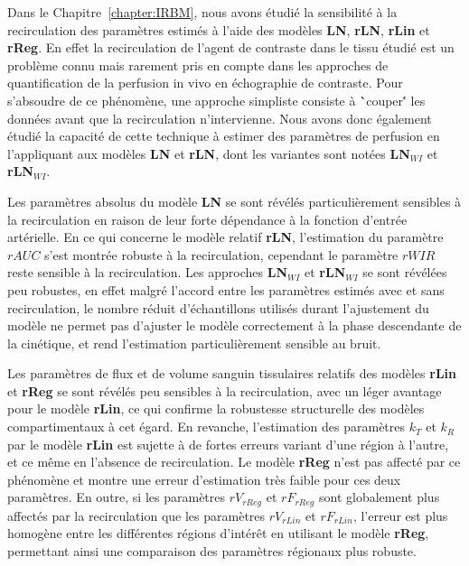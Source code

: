 \begin{otherlanguage}{francais}
Dans le Chapitre~\ref{chapter:IRBM}, nous avons \'etudi\'e la sensibilit\'e \`a la recirculation des param\`etres estim\'es \`a l'aide des mod\`eles \textbf{LN}, \textbf{rLN}, \textbf{rLin} et \textbf{rReg}.
En effet la recirculation de l'agent de contraste dans le tissu \'etudi\'e est un probl\`eme connu mais rarement pris en compte dans les approches de quantification de la perfusion in vivo en \'echographie de contraste.
Pour s'absoudre de ce ph\'enom\`ene, une approche simpliste consiste \`a \``couper\'' les donn\'ees avant que la recirculation n'intervienne.
Nous avons donc \'egalement \'etudi\'e la capacit\'e de cette technique \`a estimer des param\`etres de perfusion en l'appliquant aux mod\`eles \textbf{LN} et \textbf{rLN}, dont les variantes sont not\'ees \textbf{LN$_{WI}$} et \textbf{rLN$_{WI}$}.

Les param\`etres absolus du mod\`ele \textbf{LN} se sont r\'ev\'el\'es particuli\`erement sensibles \`a la recirculation en raison de leur forte d\'ependance \`a la fonction d'entr\'ee art\'erielle.
En ce qui concerne le mod\`ele relatif \textbf{rLN}, l'estimation du param\`etre $rAUC$ s'est montr\'ee robuste \`a la recirculation, cependant le param\`etre $rWIR$ reste sensible \`a la recirculation.
Les approches \textbf{LN$_{WI}$} et \textbf{rLN$_{WI}$} se sont r\'ev\'el\'ees peu robustes, en effet malgr\'e l'accord entre les param\`etres estim\'es avec et sans recirculation, le nombre r\'eduit d'\'echantillons utilis\'es durant l'ajustement du mod\`ele ne permet pas d'ajuster le mod\`ele correctement \`a la phase descendante de la cin\'etique, et rend l'estimation particuli\`erement sensible au bruit.

Les param\`etres de flux et de volume sanguin tissulaires relatifs des mod\`eles \textbf{rLin} et \textbf{rReg} se sont r\'ev\'el\'es peu sensibles \`a la recirculation, avec un l\'eger avantage pour le mod\`ele \textbf{rLin}, ce qui confirme la robustesse structurelle des mod\`eles compartimentaux \`a cet \'egard.
En revanche, l'estimation des param\`etres $k_T$ et $k_R$ par le mod\`ele \textbf{rLin} est sujette \`a de fortes erreurs variant d'une r\'egion \`a l'autre, et ce m\^eme en l'absence de recirculation.
Le mod\`ele \textbf{rReg} n'est pas affect\'e par ce ph\'enom\`ene et montre une erreur d'estimation tr\`es faible pour ces deux param\`etres.
En outre, si les param\`etres $rV_{rReg}$ et $rF_{rReg}$ sont globalement plus affect\'es par la recirculation que les param\`etres $rV_{rLin}$ et $rF_{rLin}$, l'erreur est plus homog\`ene entre les diff\'erentes r\'egions d'int\'er\^et en utilisant le mod\`ele \textbf{rReg}, permettant ainsi une comparaison des param\`etres r\'egionaux plus robuste.


\end{otherlanguage}
